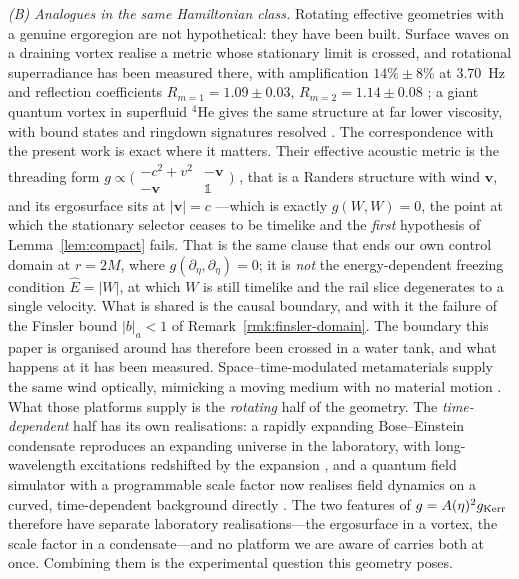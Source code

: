 \documentclass[12pt]{iopart}
\theoremstyle{plain}
\theoremstyle{definition}
\theoremstyle{remark}
\newcommand{\Ehat}{\hat E}
\begin{document}
\emph{(B) Analogues in the same Hamiltonian class.} Rotating effective geometries
with a genuine ergoregion are not hypothetical: they have been built. Surface waves
on a draining vortex realise a metric whose stationary limit is crossed, and
rotational superradiance has been measured there, with amplification $14\%\pm8\%$ at
$3.70$~Hz and reflection coefficients $R_{m=1}=1.09\pm0.03$, $R_{m=2}=1.14\pm0.08$
\cite{TorresEtAl2017}; a giant quantum vortex in superfluid $^4$He gives the same
structure at far lower viscosity, with bound states and ringdown signatures resolved
\cite{SvancaraEtAl2024}. The correspondence with the present work is exact where it
matters. Their effective acoustic metric is the threading form
$g\propto\big(\begin{smallmatrix}-c^2+v^2&-\boldsymbol v\\-\boldsymbol v&\mathbb
1\end{smallmatrix}\big)$ \cite[Eq.~(1)]{SvancaraEtAl2024}, that is a Randers
structure with wind $\boldsymbol v$, and its ergosurface sits at $|\boldsymbol v|=c$
---which is exactly $g(W,W)=0$, the point at which the stationary selector ceases to
be timelike and the \emph{first} hypothesis of Lemma~\ref{lem:compact} fails. That is
the same clause that ends our own control domain at $r=2M$, where
$g(\partial_\eta,\partial_\eta)=0$; it is \emph{not} the energy-dependent freezing
condition $\Ehat=|W|$, at which $W$ is still timelike and the rail slice degenerates
to a single velocity. What is shared is the causal boundary, and with it the failure of
the Finsler bound $|b|_a<1$ of Remark~\ref{rmk:finsler-domain}. The boundary this
paper is organised around has therefore been crossed in a water tank, and what
happens at it has been measured. Space--time-modulated metamaterials supply the same
wind optically, mimicking a moving medium with no material motion
\cite{HuidobroEtAl2019}. What those platforms supply is the \emph{rotating} half of the geometry. The
\emph{time-dependent} half has its own realisations: a rapidly expanding
Bose--Einstein condensate reproduces an expanding universe in the laboratory, with
long-wavelength excitations redshifted by the expansion \cite{EckelEtAl2018}, and a
quantum field simulator with a programmable scale factor now realises field dynamics
on a curved, time-dependent background directly \cite{ViermannEtAl2022}. The two
features of $g=A(\eta)^2g_{\rm Kerr}$ therefore have separate laboratory
realisations---the ergosurface in a vortex, the scale factor in a condensate---and
no platform we are aware of carries both at once. Combining them is the experimental
question this geometry poses.
\end{document}
